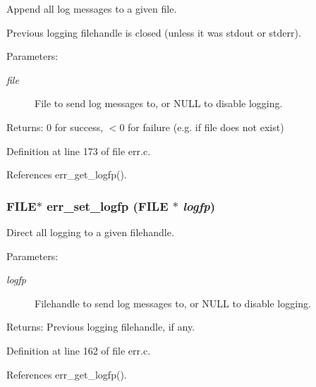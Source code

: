 Append all log messages to a given file. 

Previous logging filehandle is closed (unless it was stdout or stderr).

\begin{Desc}
\item[Parameters:]
\begin{description}
\item[{\em file}]File to send log messages to, or NULL to disable logging. \end{description}
\end{Desc}
\begin{Desc}
\item[Returns:]0 for success, $<$0 for failure (e.g. if file does not exist) \end{Desc}


Definition at line 173 of file err.c.

References err\_\-get\_\-logfp().
\subsubsection[{err\_\-set\_\-logfp}]{\setlength{\rightskip}{0pt plus 5cm}FILE$\ast$ err\_\-set\_\-logfp (FILE $\ast$ {\em logfp})}\label{err_8c_60adc1968822a513d4111963b3eddd79}


Direct all logging to a given filehandle. 

\begin{Desc}
\item[Parameters:]
\begin{description}
\item[{\em logfp}]Filehandle to send log messages to, or NULL to disable logging. \end{description}
\end{Desc}
\begin{Desc}
\item[Returns:]Previous logging filehandle, if any. \end{Desc}


Definition at line 162 of file err.c.

References err\_\-get\_\-logfp().